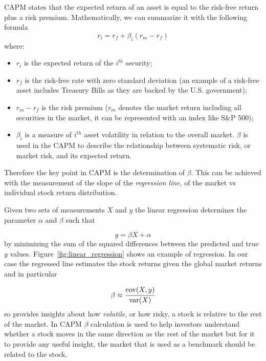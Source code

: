 CAPM states that the expected return of an asset is equal to the risk-free return plus a risk premium. 
Mathematically, we can summarize it with the following formula
\begin{equation}
r_i = r_f + \beta_i(r_m-r_f)
\label{eq:capm}
\end{equation}
where:
\begin{itemize}
	\item $r_i$ is the expected return of the $i^{th}$ security;
	\item $r_f$ is the risk-free rate with zero standard deviation (an example of a risk-free asset includes Treasury Bills as they are backed by the U.S. government);
	\item $r_m - r_f$ is the risk premium ($r_m$ denotes the market return including all securities in the market, it can be represented with an index like S\&P 500);
	\item $\beta_i$ is a measure of $i^{th}$ asset volatility in relation to the overall market. 
	$\beta$ is used in the CAPM to describe the relationship between systematic risk, or market risk, and its expected return.
\end{itemize}
	
Therefore the key point in CAPM is the determination of $\beta$. This can be achieved with the measurement of the slope of the \emph{regression line}, of the market vs individual stock return distribution.

Given two sets of measurements $X$ and $y$ the linear regression determines the parameter $\alpha$ and $\beta$ such that

\begin{equation}y=\beta X + \alpha\end{equation}
by minimizing the sum of the squared differences between the predicted and true $y$ values.
Figure~\ref{fig:linear_regression} shows an example of regression. 
In our case the regressed line estimates the stock returns given the global market returns and in particular 

\begin{equation}\beta \approx \cfrac{\textrm{cov}(X,y)}{\textrm {var}(X)}\end{equation}
so provides insights about how \emph{volatile}, or how risky, a stock is relative to the rest of the market.
In CAPM $\beta$ calculation is used to help investors understand whether a stock moves in the same direction as the rest of the market but for it to provide any useful insight, the market that is used as a benchmark should be related to the stock.


